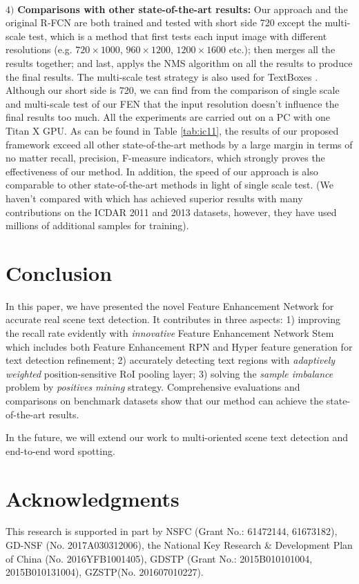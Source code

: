 \documentclass[letterpaper]{article}
\begin{document}
\\
$4)$ \textbf{Comparisons with other state-of-the-art results:} Our approach and the original R-FCN are both trained and tested with short side 720 except the multi-scale test, which is a method that first tests each input image with different resolutions (e.g. $720\times 1000$, $960\times 1200$, $1200\times 1600$ etc.); then merges all the results together; and last, applys the NMS algorithm on all the results to produce the final results. The multi-scale test strategy is also used for TextBoxes \cite{liao2017textboxes}. Although our short side is 720, we can find from the comparison of single scale and multi-scale test of our FEN that the input resolution doesn't influence the final results too much. All the experiments are carried out on a PC with one Titan X GPU. As can be found in Table \ref{tab:ic11}, the results of our proposed framework exceed all other state-of-the-art methods by a large margin in terms of no matter recall, precision, F-measure indicators, which strongly proves the effectiveness of our method. In addition, the speed of our approach is also comparable to other state-of-the-art methods in light of single scale test. (We haven't compared with \cite{sun2015robust} which has achieved
superior results with many contributions on the ICDAR 2011 and 2013 datasets, however, they have used millions of additional samples for training).

\section{Conclusion}
In this paper, we have presented the novel Feature Enhancement Network for accurate real scene text detection. It contributes in three aspects: 1) improving the recall rate evidently with \textit{innovative} Feature Enhancement Network Stem which includes both Feature Enhancement RPN and Hyper feature generation for text detection refinement; 2) accurately  detecting text regions with \textit{adaptively weighted} position-sensitive RoI pooling layer; 3) solving the \textit{sample imbalance} problem by \textit{positives mining} strategy. Comprehensive evaluations and comparisons on benchmark datasets show that our method can achieve the state-of-the-art results.

In the future, we will extend our work to multi-oriented scene text detection and end-to-end word spotting.

\section{ Acknowledgments}
This research is supported in part by NSFC (Grant No.: 61472144, 61673182), GD-NSF (No. 2017A030312006), the National Key Research \& Development Plan of China (No. 2016YFB1001405), GDSTP (Grant No.: 2015B010101004, 2015B010131004), GZSTP(No. 201607010227).




\end{document}
